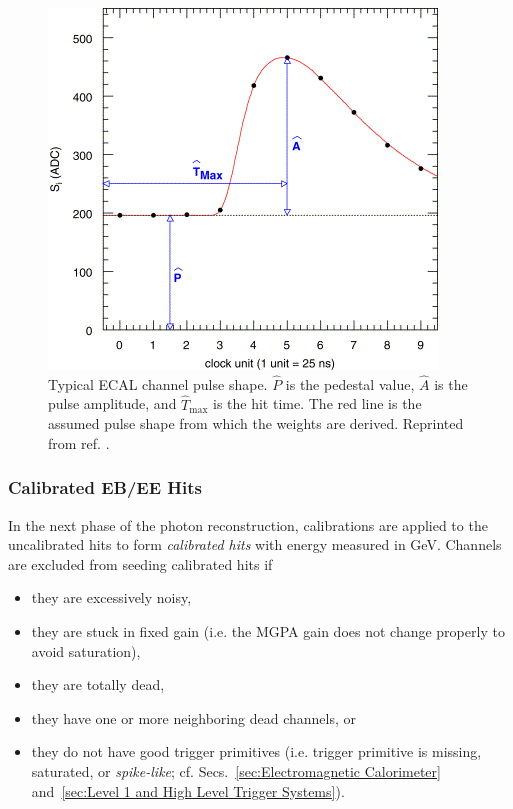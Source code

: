 \documentclass[dissertation.tex]{subfiles}
\begin{document}
\begin{figure}
	\centering
	\includegraphics[scale=4.0]{pulse}
	\caption{Typical ECAL channel pulse shape.  $\widehat{P}$ is the pedestal value, $\widehat{A}$ is the pulse amplitude, and $\widehat{T}_{\mathrm{max}}$ is the hit time.  The red line is the assumed pulse shape from which the weights are derived.  Reprinted from ref. \cite{Bruneliere}.}
	\label{fig:pulse}
\end{figure}

\subsubsection{Calibrated EB/EE Hits}
\label{sec:Calibrated EB/EE Hits}

In the next phase of the photon reconstruction, calibrations are applied to the uncalibrated hits to form \textit{calibrated hits} with energy measured in GeV.  Channels are excluded from seeding calibrated hits if

\begin{itemize}
\item they are excessively noisy,
\item they are stuck in fixed gain (i.e. the MGPA gain does not change properly to avoid saturation),
\item they are totally dead,
\item they have one or more neighboring dead channels, or
\item they do not have good trigger primitives (i.e. trigger primitive is missing, saturated, or \textit{spike-like}; cf. Secs.~\ref{sec:Electromagnetic Calorimeter} and~\ref{sec:Level 1 and High Level Trigger Systems}).
\end{itemize}
\end{document}
